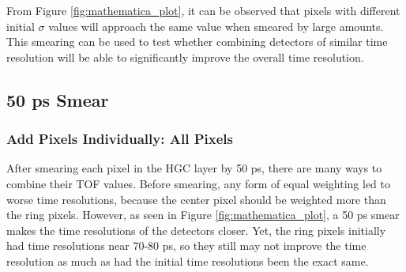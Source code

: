 \documentclass[twocolumn,aps,prd,reprint,superscriptaddress,floatfix]{revtex4-1}
\begin{document}
From Figure \ref{fig:mathematica_plot}, it can be observed that pixels with different initial $\sigma$ values will approach the same value when smeared by large amounts. 
This smearing can be used to test whether combining detectors of similar time resolution will be able to significantly improve the overall time resolution.

\subsection{50 ps Smear}
\subsubsection{Add Pixels Individually: All Pixels}
After smearing each pixel in the HGC layer by 50 ps, there are many ways to combine their TOF values. 
Before smearing, any form of equal weighting led to worse time resolutions, because the center pixel should be weighted more than the ring pixels.
However, as seen in Figure \ref{fig:mathematica_plot}, a 50 ps smear makes the time resolutions of the detectors closer. 
Yet, the ring pixels initially had time resolutions near 70-80 ps, so they still may not improve the time resolution as much as had the initial time resolutions been the exact same.
\end{document}
